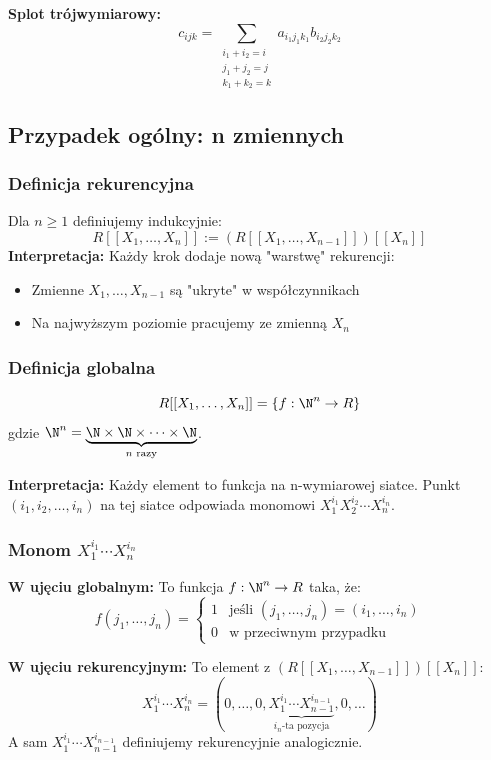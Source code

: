 \textbf{Splot trójwymiarowy:}
\[
c_{ijk} = \sum_{\substack{i_1+i_2=i \\ j_1+j_2=j \\ k_1+k_2=k}} a_{i_1j_1k_1} b_{i_2j_2k_2}
\]

\subsection{Przypadek ogólny: n zmiennych}

\subsubsection{Definicja rekurencyjna}

Dla $n \geq 1$ definiujemy indukcyjnie:
\[
R[[X_1, \dots, X_n]] := (R[[X_1, \dots, X_{n-1}]])[[X_n]]
\]
\textbf{Interpretacja:} Każdy krok dodaje nową "warstwę" rekurencji:
\begin{itemize}
\item Zmienne $X_1, \dots, X_{n-1}$ są "ukryte" w współczynnikach
\item Na najwyższym poziomie pracujemy ze zmienną $X_n$
\end{itemize}

\subsubsection{Definicja globalna}

\[
R[[X_1, \dots, X_n]] = \left\{ f: \N^n \to R \right\}
\]
gdzie $\N^n = \underbrace{\N \times \N \times \cdots \times \N}_{n \text{ razy}}$.

\textbf{Interpretacja:} Każdy element to funkcja na n-wymiarowej siatce. Punkt $(i_1, i_2, \dots, i_n)$ na tej siatce odpowiada monomowi $X_1^{i_1}X_2^{i_2}\cdots X_n^{i_n}$.

\subsubsection{Monom $X_1^{i_1}\cdots X_n^{i_n}$}

\textbf{W ujęciu globalnym:} To funkcja $f: \N^n \to R$ taka, że:
\[
f(j_1, \dots, j_n) = 
\begin{cases}
1 & \text{jeśli } (j_1, \dots, j_n) = (i_1, \dots, i_n) \\
0 & \text{w przeciwnym przypadku}
\end{cases}
\]

\textbf{W ujęciu rekurencyjnym:} To element z $(R[[X_1, \dots, X_{n-1}]])[[X_n]]$:
\[
X_1^{i_1}\cdots X_n^{i_n} = (0, \dots, 0, \underbrace{X_1^{i_1}\cdots X_{n-1}^{i_{n-1}}}_{i_n\text{-ta pozycja}}, 0, \dots)
\]
A sam $X_1^{i_1}\cdots X_{n-1}^{i_{n-1}}$ definiujemy rekurencyjnie analogicznie.

